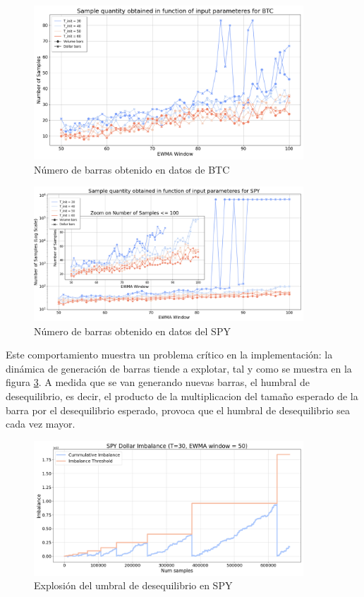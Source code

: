 \documentclass[a4paper,12pt, twoside]{report}
\begin{document}
\begin{figure}[H]
    \centering
    \includegraphics[width=0.9\textwidth]{./figures/barrido_parametros_imbalance_btc.png}
    \caption{Número de barras obtenido en datos de BTC}
    \label{fig:barrido-btc}
\end{figure}

\begin{figure}[H]
    \centering
    \includegraphics[width=0.9\textwidth]{./figures/barrido_parametros_imbalance_spy.png}
    \caption{Número de barras obtenido en datos del SPY}
    \label{fig:barrido-spy}
\end{figure}

Este comportamiento muestra un problema crítico en la implementación: la dinámica de generación de barras tiende a explotar, 
tal y como se muestra en la figura \ref{fig:explo-spy}. A medida que se van generando nuevas barras, el humbral de desequilibrio,
es decir, el producto de la multiplicacion del tamaño esperado de la barra por el desequilibrio esperado, provoca que el humbral de
desequilibrio sea cada vez mayor.

\begin{figure}[H]
    \centering
    \includegraphics[width=0.9\textwidth]{./figures/spy_volume_explo.png}
    \caption{Explosión del umbral de desequilibrio en SPY}
    \label{fig:explo-spy}
\end{figure}
\end{document}
